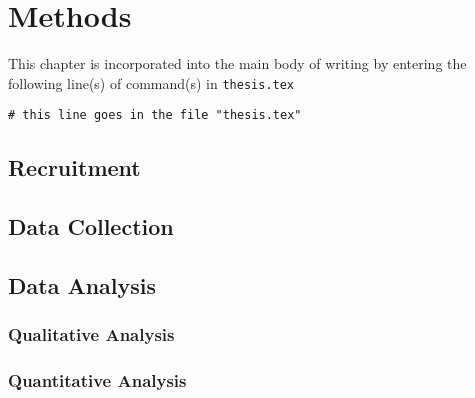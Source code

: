 \chapter{Methods}
This chapter is incorporated into the main body of writing by entering the following line(s) of command(s) in \texttt{thesis.tex}
\begin{verbatim}
# this line goes in the file "thesis.tex"

\end{verbatim}

\section{Recruitment}


\section{Data Collection}



\section{Data Analysis}
\subsection{Qualitative Analysis}
\subsection{Quantitative Analysis}


